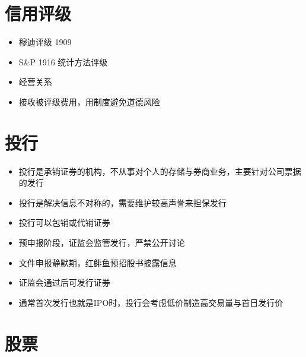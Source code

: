 \documentclass[]{book}
\providecommand{\tightlist}{%
  \setlength{\itemsep}{0pt}\setlength{\parskip}{0pt}}
\begin{document}
\hypertarget{ux4fe1ux7528ux8bc4ux7ea7}{%
\section{信用评级}\label{ux4fe1ux7528ux8bc4ux7ea7}}

\begin{itemize}
\tightlist
\item
  穆迪评级 1909
\item
  S\&P 1916 统计方法评级
\item
  经营关系
\item
  接收被评级费用，用制度避免道德风险
\end{itemize}

\hypertarget{ux6295ux884c}{%
\section{投行}\label{ux6295ux884c}}

\begin{itemize}
\tightlist
\item
  投行是承销证券的机构，不从事对个人的存储与券商业务，主要针对公司票据的发行
\item
  投行是解决信息不对称的，需要维护较高声誉来担保发行
\item
  投行可以包销或代销证券
\item
  预申报阶段，证监会监管发行，严禁公开讨论
\item
  文件申报静默期，红鲱鱼预招股书披露信息
\item
  证监会通过后可发行证券
\item
  通常首次发行也就是IPO时，投行会考虑低价制造高交易量与首日发行价
\end{itemize}

\hypertarget{ux80a1ux7968}{%
\section{股票}\label{ux80a1ux7968}}
\end{document}
